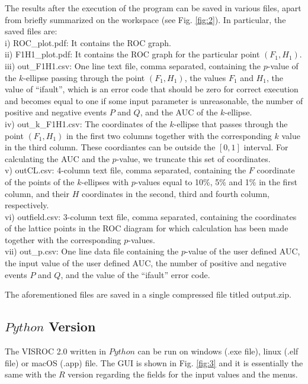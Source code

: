 \documentclass[preprint,12pt]{elsarticle}
\begin{document}
The results after the execution of the program can be saved in various files, apart from briefly summarized on the workspace (see Fig. \ref{fig:2}). In particular, the saved files are:\\
i) ROC\_plot.pdf: It contains the ROC graph.\\
ii) F1H1\_plot.pdf: It contains the ROC graph for the particular point $(F_1,H_1)$.\\
iii) out\_F1H1.csv: One line text file, comma separated, containing the $p$-value of the $k$-ellipse passing through the point $(F_1,H_1)$, the values $F_1$ and $H_1$, the value of ``ifault'', which is an error code that should be zero for correct execution and becomes equal to one if some input parameter is unreasonable, the number of positive and negative events $P$ and $Q$, and the AUC of the $k$-ellipse.\\
iv) out\_k\_F1H1.csv: The coordinates of the $k$-ellipse that passes through the point $(F_1,H_1)$ in the first two columns together with the corresponding $k$ value in the third column. These coordiantes can be outside the $[0,1]$ interval. For calculating the AUC and the $p$-value, we truncate this set of coordinates.\\
v) outCL.csv: 4-column text file, comma separated, containing the $F$ coordinate of the points of the $k$-ellipses with $p$-values equal to 10\%, 5\% and 1\% in the first column, and their $H$ coordinates in the second, third and fourth column, respectively.\\
vi) outfield.csv: 3-column text file, comma separated, containing the coordinates of the lattice points in the ROC diagram for which calculation has been made together with the corresponding $p$-values.\\
vii) out\_p.csv: One line data file containing the $p$-value of the user defined AUC, the input value of the user defined AUC, the number of positive and negative events $P$ and $Q$, and the value of the ``ifault'' error code.

The aforementioned files are saved in a single compressed file titled output.zip.

\subsection{$Python$ Version}\label{Python}

The VISROC 2.0 written in $Python$ can be run on windows (.exe file), linux (.elf file) or macOS (.app) file. The GUI is shown in Fig. \ref{fig:3} and it is essentially the same with the $R$ version regarding the fields for the input values and the menus.
\end{document}
